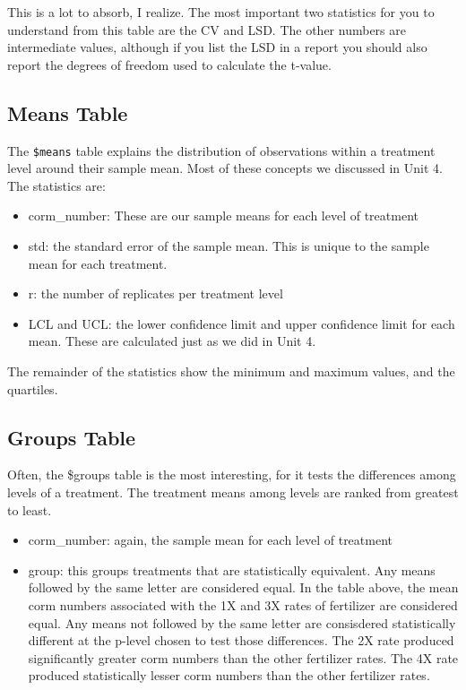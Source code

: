 \documentclass[
]{book}
\providecommand{\tightlist}{%
  \setlength{\itemsep}{0pt}\setlength{\parskip}{0pt}}
\begin{document}
This is a lot to absorb, I realize. The most important two statistics for you to understand from this table are the CV and LSD. The other numbers are intermediate values, although if you list the LSD in a report you should also report the degrees of freedom used to calculate the t-value.

\hypertarget{means-table}{%
\subsection{Means Table}\label{means-table}}

The \texttt{\$means} table explains the distribution of observations within a treatment level around their sample mean. Most of these concepts we discussed in Unit 4. The statistics are:

\begin{itemize}
\tightlist
\item
  corm\_number: These are our sample means for each level of treatment
\item
  std: the standard error of the sample mean. This is unique to the sample mean for each treatment.
\item
  r: the number of replicates per treatment level
\item
  LCL and UCL: the lower confidence limit and upper confidence limit for each mean. These are calculated just as we did in Unit 4.
\end{itemize}

The remainder of the statistics show the minimum and maximum values, and the quartiles.

\hypertarget{groups-table}{%
\subsection{Groups Table}\label{groups-table}}

Often, the \$groups table is the most interesting, for it tests the differences among levels of a treatment. The treatment means among levels are ranked from greatest to least.

\begin{itemize}
\tightlist
\item
  corm\_number: again, the sample mean for each level of treatment
\item
  group: this groups treatments that are statistically equivalent. Any means followed by the same letter are considered equal. In the table above, the mean corm numbers associated with the 1X and 3X rates of fertilizer are considered equal. Any means not followed by the same letter are consisdered statistically different at the p-level chosen to test those differences. The 2X rate produced significantly greater corm numbers than the other fertilizer rates. The 4X rate produced statistically lesser corm numbers than the other fertilizer rates.
\end{itemize}
\end{document}
